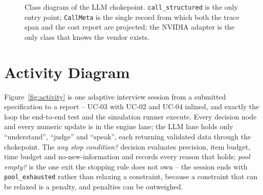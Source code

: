 \documentclass{tietreport}
\begin{document}
\begin{figure}[htbp]
\caption{Class diagram of the LLM chokepoint. \texttt{call\_structured} is the only entry point; \texttt{CallMeta} is the single record from which both the trace span and the cost report are projected; the NVIDIA adapter is the only class that knows the vendor exists.}
\label{fig:class-llm}
\end{figure}

\section{Activity Diagram}

Figure~\ref{fig:activity} is one adaptive interview session from a submitted specification to a
report -- UC-03 with UC-02 and UC-04 inlined, and exactly the loop the end-to-end test and the
simulation runner execute. Every decision node and every numeric update is in the engine lane;
the LLM lane holds only ``understand'', ``judge'' and ``speak'', each returning validated data
through the chokepoint. The \emph{any stop condition?} decision evaluates precision, item budget,
time budget and no-new-information and records every reason that holds; \emph{pool empty?} is
the one exit the stopping rule does not own -- the session ends with \texttt{pool\_exhausted}
rather than relaxing a constraint, because a constraint that can be relaxed is a penalty, and
penalties can be outweighed.
\end{document}
